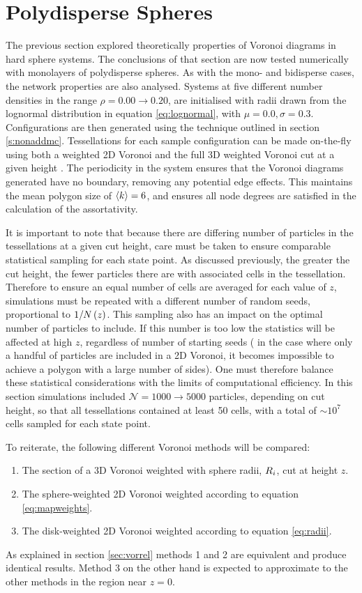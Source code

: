 \section{Polydisperse Spheres}

The previous section explored theoretically properties of Voronoi diagrams in \qtd{} hard sphere systems.
The conclusions of that section are now tested numerically with monolayers of polydisperse spheres.
As with the mono\-- and bidisperse cases, the network properties are also analysed.
Systems at five different number densities in the range $\rho=0.00\rightarrow0.20$, are initialised with radii drawn from the lognormal distribution in equation \eqref{eq:lognormal}, with $\mu=0.0,\sigma=0.3$.
Configurations are then generated using the \mc{} technique outlined in section \ref{s:nonaddmc}.
Tessellations for each sample configuration can be made on-the-fly using both a weighted 2D Voronoi and the full 3D weighted Voronoi cut at a given height \cite{Rycroft2009}.
The periodicity in the system ensures that the Voronoi diagrams generated have no boundary, removing any potential edge effects. 
This maintains the mean polygon size of $\langle k \rangle=6$, and ensures all node degrees are satisfied in the calculation of the assortativity.

It is important to note that because there are differing number of particles in the tessellations at a given cut height, care must be taken to ensure comparable statistical sampling for each state point. 
As discussed previously, the greater the cut height, the fewer particles there are with associated cells in the tessellation.
Therefore to ensure an equal number of cells are averaged for each value of $z$, simulations must be repeated with a different number of random seeds, proportional to  $1/N\left(z\right)$.
This sampling also has an impact on the optimal number of particles to include.
If this number is too low the statistics will be affected at high $z$, regardless of number of starting seeds (\eg{} in the case where only a handful of particles are included in a 2D Voronoi, it becomes impossible to achieve a polygon with a large number of sides).
One must therefore balance these statistical considerations with the limits of computational efficiency.
In this section simulations included $\mathcal{N}=1000\rightarrow 5000$ particles, depending on cut height, so that all tessellations contained at least 50 cells, with a total of $\sim 10^7$ cells sampled for each state point.

To reiterate, the following different Voronoi methods will be compared:
\begin{enumerate}
	\item The section of a 3D Voronoi weighted with sphere radii, $R_i$, cut at height $z$.
	\item The sphere\--weighted 2D Voronoi weighted according to equation \eqref{eq:mapweights}.
	\item The disk\--weighted 2D Voronoi weighted according to equation \eqref{eq:radii}.
\end{enumerate}
As explained in section \ref{sec:vorrel} methods 1 and 2 are equivalent and produce identical results.
Method 3 on the other hand is expected to approximate to the other methods in the region near $z=0$.

